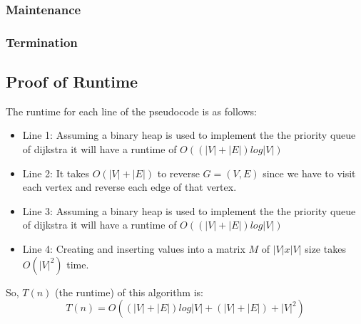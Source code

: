 \documentclass[12pt]{article}
\begin{document}
\subsubsection*{Maintenance}

\subsubsection*{Termination}

\subsection*{Proof of Runtime}
The runtime for each line of the pseudocode is as follows:
\begin{itemize}
\item Line 1: Assuming a binary heap is used to implement the the priority queue of dijkstra it will have a runtime of $O((|V|+|E|)log|V|)$
\item Line 2: It takes $O(|V|+|E|)$ to reverse $G=(V,E)$ since we have to visit each vertex and reverse each edge of that vertex.
\item Line 3: Assuming a binary heap is used to implement the the priority queue of dijkstra it will have a runtime of $O((|V|+|E|)log|V|)$
\item Line 4: Creating and inserting values into a matrix $M$ of $|V|x|V|$ size takes $O(|V|^2)$ time.
\end{itemize}
So, $T(n)$ (the runtime) of this algorithm is:
$$
T(n) = O((|V|+|E|)log|V| + (|V|+|E|) + |V|^2)
$$
\end{document}
